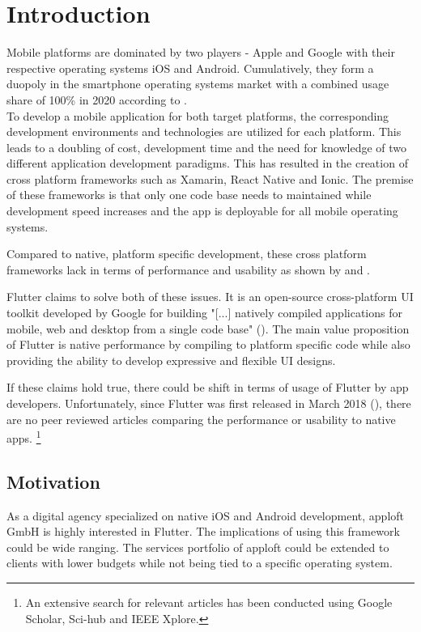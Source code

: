 \chapter{Introduction}
Mobile platforms are dominated by two players - Apple and Google with their respective operating systems iOS and Android. Cumulatively, they form a duopoly in the smartphone operating systems market with a combined usage share of 100\% in 2020 according to \textcite{IDC2021}. \\To develop a mobile application for both target platforms, the corresponding development environments and technologies are utilized for each platform. This leads to a doubling of cost, development time and the need for knowledge of two different application development paradigms. This has resulted in the creation of cross platform frameworks such as Xamarin, React Native and Ionic. The premise of these frameworks is that only one code base needs to maintained while development speed increases and the app is deployable for all mobile operating systems. 

Compared to native, platform specific development, these cross platform frameworks lack in terms of performance and usability as shown by \textcite{Mercado2016} and \textcite{Ebone2018}.

Flutter claims to solve both of these issues. It is an open-source cross-platform UI toolkit developed by Google for building "[...] natively compiled applications for mobile, web and desktop from a single code base" (\cite{FlutterDev20}). The main value proposition of Flutter is native performance by compiling to platform specific code while also providing the ability to develop expressive and flexible UI designs.

If these claims hold true, there could be shift in terms of usage of Flutter by app developers. Unfortunately, since Flutter was first released in March 2018 (\cite{FlutterReleases2020}), there are no peer reviewed articles comparing the performance or usability to native apps.
\footnote{An extensive search for relevant articles has been conducted using Google Scholar, Sci-hub and IEEE Xplore.} 

\section{Motivation}
As a digital agency specialized on native iOS and Android development, apploft GmbH is highly interested in Flutter. The implications of using this framework could be wide ranging. The services portfolio of apploft could be extended to clients with lower budgets while not being tied to a specific operating system. 


